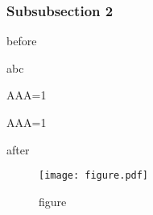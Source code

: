 \documentclass[
  a4paper,
  jafontscale=0.92,
  hanging_punctuation,
  head_space=24.8mm,
  foot_space=24.8mm]{jlreq}
\newenvironment{Shaded}{}{}
\newcommand{\DecValTok}[1]{\textcolor[rgb]{0.25,0.63,0.44}{#1}}
\newcommand{\NormalTok}[1]{#1}
\newcommand{\OperatorTok}[1]{\textcolor[rgb]{0.40,0.40,0.40}{#1}}
\begin{document}
\subsubsection{Subsubsection 2}\label{subsubsection-2-1}

before


\begin{Shaded}
\begin{Highlighting}[]
\NormalTok{abc}
\end{Highlighting}
\end{Shaded}

\vspace{-0.5\baselineskip}


\begin{Shaded}
\begin{Highlighting}[]
\NormalTok{AAA}\OperatorTok{=}\DecValTok{1}
\end{Highlighting}
\end{Shaded}

\vspace{-0.5\baselineskip}


\begin{Shaded}
\begin{Highlighting}[]
\NormalTok{AAA}\OperatorTok{=}\DecValTok{1}
\end{Highlighting}
\end{Shaded}

after

\begin{figure}
\centering
\texttt{[image: figure.pdf]}
\caption{figure}\label{fig:figure}
\end{figure}
\end{document}
